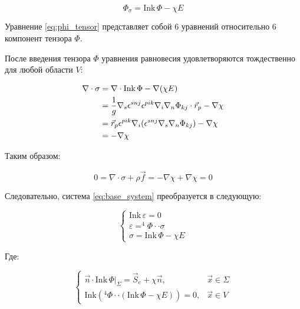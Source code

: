 \begin{equation}\label{eq:phi_tensor}
    \Phi_{\sigma} = \text{Ink} \, \Phi - \chi E
\end{equation}

Уравнение \eqref{eq:phi_tensor} представляет собой 6 уравнений относительно 6 компонент тензора \( \Phi \).

После введения тензора \( \Phi \) уравнения равновесия удовлетворяются тождественно для любой области \( V \):

\begin{align}\label{eq:equilibrium}
    \nabla \cdot \sigma 
    &= \nabla \cdot \text{Ink} \, \Phi - \nabla (\chi E) \notag \\
    &= \frac{1}{g} \nabla_s \epsilon^{snj} \epsilon^{pik} \nabla_i \nabla_n \Phi_{kj} \cdot \vec{r}_p 
    - \nabla \chi \notag \\
    &= \vec{r}_p \epsilon^{pik} \nabla_i (\epsilon^{snj} \nabla_s \nabla_n \Phi_{kj}) - \nabla \chi \notag \\
    &= -\nabla \chi
\end{align}

Таким образом:

\begin{equation}\label{eq:balance}
    0 = \nabla \cdot \sigma + \rho \vec{f} = -\nabla \chi + \nabla \chi = 0
\end{equation}

Следовательно, система \eqref{eq:base_system} преобразуется в следующую:

\begin{equation}\label{eq:new_system}
    \begin{cases}
        \text{Ink} \, \varepsilon = 0 \\
        \varepsilon = ^4\Phi \cdot\cdot \sigma \\
        \sigma = \text{Ink} \, \Phi - \chi E
    \end{cases}
\end{equation}

Где:

\begin{equation}\label{eq:boundary_conditions}
    \begin{cases}
        \vec{n} \cdot \text{Ink} \, \Phi |_{\Sigma} = \vec{S}_e + \chi \vec{n}, & \vec{x} \in \Sigma \\
        \text{Ink} \left(^4\Phi \cdot\cdot (\text{Ink} \, \Phi - \chi E)\right) = 0, & \vec{x} \in V
    \end{cases}
\end{equation}

